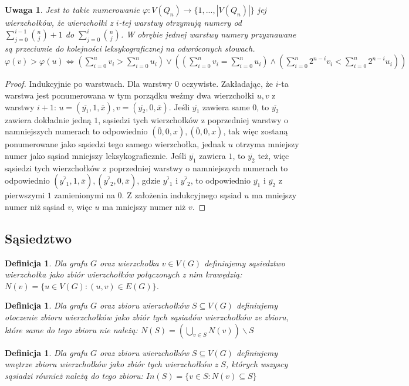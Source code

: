 \documentclass{pracamgr}
\newtheorem{defi}[theorem]{Definicja}
\newtheorem{remark}[theorem]{Uwaga}
\begin{document}
    \begin{remark}\label{numerowanie warstwowe 2}
     Jest to takie numerowanie $\varphi:V(Q_n)\rightarrow\{1,...,|V(Q_n)|\}$ jej wierzchołków,
     że wierzchołki z $i$-tej warstwy otrzymują numery od $\sum_{j=0}^{i-1}{n\choose j}+1$ do $\sum_{j=0}^{i}{n\choose j}$.
     W obrębie jednej warstwy numery przyznawane są przeciwnie do kolejności leksykograficznej na odwróconych słowach.
     $\varphi(v)>\varphi(u)\Leftrightarrow (\sum_{i=0}^n v_i>\sum_{i=0}^n u_i)
     \vee((\sum_{i=0}^n v_i=\sum_{i=0}^n u_i)\wedge(\sum_{i=0}^n2^{n-i}v_i<\sum_{i=0}^n2^{n-i}u_i))$
    \end{remark}
    \begin{proof}
     Indukcyjnie po warstwach.\newline
     Dla warstwy $0$ oczywiste.\newline
     Zakładając, że $i$-ta warstwa jest ponumerowana w tym porządku weźmy dwa wierzchołki $u,v$ z warstwy $i+1$:
     $u=(\overline{y_1},1,\overline{x}),v=(\overline{y_2},0,\overline{x})$.\newline
     Jeśli $\overline{y_1}$ zawiera same $0$, to $\overline{y_2}$ zawiera dokładnie jedną $1$, sąsiedzi tych wierzchołków z poprzedniej warstwy
     o namniejszych numerach to odpowiednio $(\overline{0},0,x),(\overline{0},0,x)$,
     tak więc zostaną ponumerowane jako sąsiedzi tego samego wierzchołka, jednak $u$ otrzyma mniejszy numer jako sąsiad mniejszy leksykograficznie.\newline
     Jeśli $\overline{y_1}$ zawiera $1$, to $\overline{y_2}$ też, więc sąsiedzi tych wierzchołków z poprzedniej warstwy
     o namniejszych numerach to odpowiednio $(\overline{y'_1},1,\overline{x}),(\overline{y'_2},0,\overline{x})$, gdzie $\overline{y'_1}$ i $\overline{y'_2}$,
     to odpowiednio $\overline{y_1}$ i $\overline{y_2}$ z pierwszymi $1$ zamienionymi na $0$. Z założenia indukcyjnego sąsiad $u$ ma mniejszy numer niż sąsiad $v$,
     więc $u$ ma mniejszy numer niż $v$.
    \end{proof}
   \subsection{Sąsiedztwo}
    \begin{defi}\label{sasiedztwo wierzcholka}
     Dla grafu $G$ oraz wierzchołka $v\in V(G)$ definiujemy \emph{sąsiedztwo wierzchołka} jako zbiór wierzchołków połączonych z nim krawędzią:
     $N(v)=\{u\in V(G):(u,v)\in E(G)\}$.
    \end{defi}
    \begin{defi}\label{otoczenie zbioru wierzcholkow}
     Dla grafu $G$ oraz zbioru wierzchołków $S\subseteq V(G)$ definiujemy \emph{otoczenie zbioru wierzchołków} jako zbiór tych sąsiadów wierzchołków ze zbioru,
     które same do tego zbioru nie należą: $N(S)=(\bigcup_{v\in S}N(v))\backslash S$
    \end{defi}
    \begin{defi}\label{wnetrze zbioru wierzcholkow}
     Dla grafu $G$ oraz zbioru wierzchołków $S\subseteq V(G)$ definiujemy \emph{wnętrze zbioru wierzchołków} jako zbiór tych wierzchołków z $S$,
     których wszyscy sąsiadzi również należą do tego zbioru: $In(S)=\{v\in S:N(v)\subseteq S\}$
    \end{defi}
\end{document}
